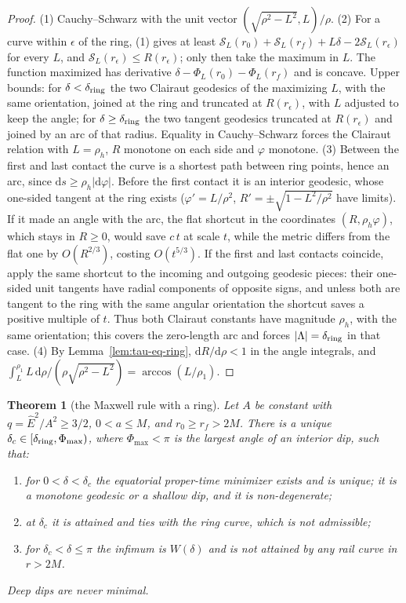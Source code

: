 \documentclass[aip,jmp,amsmath,amssymb,reprint]{revtex4-2}
\newcommand{\Ehat}{\hat E}
\newcommand{\dd}{\mathrm{d}}
\theoremstyle{plain}
\newtheorem{theorem}{Theorem}
\theoremstyle{definition}
\begin{document}
\begin{proof}
(1) Cauchy--Schwarz with the unit vector $(\sqrt{\rho^2-L^2},L)/\rho$. (2) For a curve within $\epsilon$
of the ring, (1) gives at least $\mathcal S_L(r_0)+\mathcal S_L(r_f)+L\delta-2\mathcal S_L(r_\epsilon)$ for every $L$, and
$\mathcal S_L(r_\epsilon)\le R(r_\epsilon)$; only then take the maximum in $L$. The function maximized has derivative
$\delta-\Phi_L(r_0)-\Phi_L(r_f)$ and is concave. Upper bounds: for $\delta<\delta_{\rm ring}$ the two Clairaut
geodesics of the maximizing $L$, with the same orientation, joined at the ring and truncated at
$R(r_\epsilon)$, with $L$ adjusted to keep the angle; for $\delta\ge\delta_{\rm ring}$ the two tangent geodesics
truncated at $R(r_\epsilon)$ and joined by an arc of that radius. Equality in Cauchy--Schwarz forces
the Clairaut relation with $L=\rho_h$, $R$ monotone on each side and $\varphi$ monotone. (3) Between
the first and last contact the curve is a shortest path between ring points, hence an arc,
since $\dd s\ge\rho_h|\dd\varphi|$. Before the first contact it is an interior geodesic, whose
one-sided tangent at the ring exists ($\varphi'=L/\rho^2$, $R'=\pm\sqrt{1-L^2/\rho^2}$ have limits). If it
made an angle with the arc, the flat shortcut in the coordinates $(R,\rho_h\varphi)$, which stays in
$R\ge0$, would save $c\,t$ at scale $t$, while the metric differs from the flat one by
$O(R^{2/3})$, costing $O(t^{5/3})$. If the first and last contacts coincide, apply the same shortcut
to the incoming and outgoing geodesic pieces: their one-sided unit tangents have radial
components of opposite signs, and unless both are tangent to the ring with the same angular
orientation the shortcut saves a positive multiple of $t$. Thus both Clairaut constants have
magnitude $\rho_h$, with the same orientation; this covers the zero-length arc and forces
$|\Lambda|=\delta_{\rm ring}$ in that case. (4) By Lemma~\ref{lem:tau-eq-ring}, $\dd R/\dd\rho<1$ in the angle
integrals, and $\int_L^{\rho_1}L\,\dd\rho/(\rho\sqrt{\rho^2-L^2})=\arccos(L/\rho_1)$.
\end{proof}

\begin{theorem}[the Maxwell rule with a ring]\label{thm:tau-eq-maxwell}
Let $A$ be constant with $q=\Ehat^2/A^2\ge3/2$, $0<a\le M$, and $r_0\ge r_f>2M$. There is a unique
$\delta_c\in[\delta_{\rm ring},\Phi_{\max})$, where $\Phi_{\max}<\pi$ is the largest angle of an interior dip,
such that:
\begin{enumerate}
\item for $0<\delta<\delta_c$ the equatorial proper-time minimizer exists and is unique; it is a
  monotone geodesic or a shallow dip, and it is non-degenerate;
\item at $\delta_c$ it is attained and ties with the ring curve, which is not admissible;
\item for $\delta_c<\delta\le\pi$ the infimum is $W(\delta)$ and is not attained by any rail curve in $r>2M$.
\end{enumerate}
Deep dips are never minimal.
\end{theorem}
\end{document}

